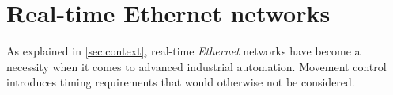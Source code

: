 \section{Real-time Ethernet networks}\label{sec:rt-networks}

As explained in \autoref{sec:context}, real-time \emph{Ethernet} networks have become a necessity when it comes to advanced industrial automation. Movement control introduces timing requirements that would otherwise not be considered.











